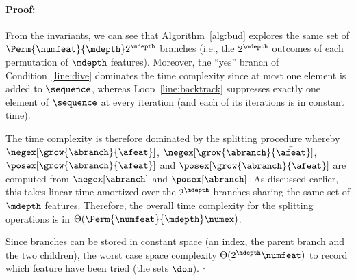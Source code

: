 \documentclass{article}
\newenvironment{proof}{\paragraph{Proof:}}{\hfill$\square$}
\begin{document}
			
			\begin{proof}
				From the invariants, we can see that Algorithm~\ref{alg:bud} explores the same set of $\Perm{\numfeat}{\mdepth}2^\mdepth$ branches (i.e., the $2^{\mdepth}$ outcomes of each permutation of ${\mdepth}$ features).
				Moreover, the ``yes'' branch of Condition~\ref{line:dive} dominates the time complexity since at most one element is added to $\sequence$, whereas  Loop~\ref{line:backtrack} suppresses exactly one element of $\sequence$ at every iteration (and each of its iterations is in constant time).
				
				The time complexity is therefore dominated by the splitting procedure whereby $\negex[\grow{\abranch}{\afeat}]$, $\negex[\grow{\abranch}{\bar{\afeat}}]$, $\posex[\grow{\abranch}{\afeat}]$ and $\posex[\grow{\abranch}{\bar{\afeat}}]$ are computed from $\negex[\abranch]$ and $\posex[\abranch]$. As discussed earlier, this takes linear time amortized over the $2^{\mdepth}$ branches sharing the same set of $\mdepth$ features. Therefore, the overall time complexity for the splitting operations is in $\Theta(\Perm{\numfeat}{\mdepth}\numex)$.
				
				
				Since branches can be stored in constant space (an index, the parent branch and the two children),
				the worst case space complexity $\Theta(2^{\mdepth}\numfeat)$ to record which feature have been tried (the sets $\dom$).
				\end{proof}
				
\end{document}
